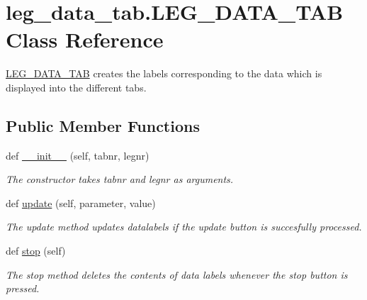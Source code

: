 \hypertarget{classleg__data__tab_1_1LEG__DATA__TAB}{}\section{leg\+\_\+data\+\_\+tab.\+L\+E\+G\+\_\+\+D\+A\+T\+A\+\_\+\+T\+AB Class Reference}
\label{classleg__data__tab_1_1LEG__DATA__TAB}


\hyperlink{classleg__data__tab_1_1LEG__DATA__TAB}{L\+E\+G\+\_\+\+D\+A\+T\+A\+\_\+\+T\+AB} creates the labels corresponding to the data which is displayed into the different tabs.  


\subsection*{Public Member Functions}
\begin{DoxyCompactItemize}
\item 
def \hyperlink{classleg__data__tab_1_1LEG__DATA__TAB_a804e68298406312ced8c4331f3e1483d}{\+\_\+\+\_\+init\+\_\+\+\_\+} (self, tabnr, legnr)
\begin{DoxyCompactList}\small\item\em The constructor takes tabnr and legnr as arguments. \end{DoxyCompactList}\item 
def \hyperlink{classleg__data__tab_1_1LEG__DATA__TAB_a4fc4d0afb8faa78cf61dfc692967c6eb}{update} (self, parameter, value)
\begin{DoxyCompactList}\small\item\em The update method updates datalabels if the update button is succesfully processed. \end{DoxyCompactList}\item 
def \hyperlink{classleg__data__tab_1_1LEG__DATA__TAB_ab878dd9679f97dc656923aeec6fd7cb8}{stop} (self)
\begin{DoxyCompactList}\small\item\em The stop method deletes the contents of data labels whenever the stop button is pressed. \end{DoxyCompactList}\end{DoxyCompactItemize}
